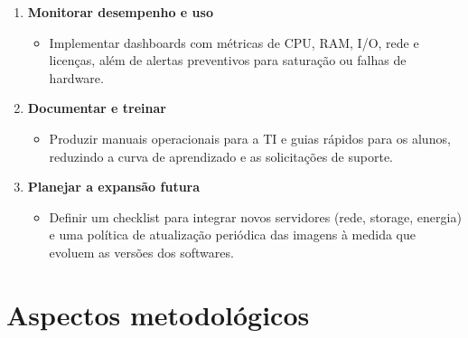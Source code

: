 \begin{enumerate}
    \item \textbf{Monitorar desempenho e uso}
    \begin{itemize}
        \item Implementar dashboards com métricas de CPU, RAM, I/O, rede e licenças, além de alertas preventivos para saturação ou falhas de hardware.
    \end{itemize}
    
    \item \textbf{Documentar e treinar}
    \begin{itemize}
        \item Produzir manuais operacionais para a TI e guias rápidos para os alunos, reduzindo a curva de aprendizado e as solicitações de suporte.
    \end{itemize}
    
    \item \textbf{Planejar a expansão futura}
    \begin{itemize}
        \item Definir um checklist para integrar novos servidores (rede, storage, energia) e uma política de atualização periódica das imagens à medida que evoluem as versões dos softwares.
    \end{itemize}
\end{enumerate}

\section{Aspectos metodológicos}

